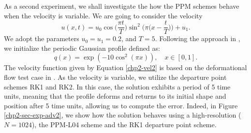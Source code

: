 As a second experiment, we shall investigate the how the PPM schemes behave when the velocity
is variable. 
We are going to consider the velocity
\begin{equation}
	\label{chp2-vel2}
	u(x,t) = u_0\cos{\bigg(\frac{\pi t}{T}\bigg)}\sin^2\bigg(\pi \bigg(x-\frac{t}{T}\bigg)\bigg) + u_1.
\end{equation}
We adopt the parameters $u_0 = u_1 = 0.2$,  and $T = 5$.
Following the approach in \citet{trefethen:2000}, we initialize the periodic Gaussian profile defined as:
\begin{equation}
	\label{chp2-ic2}
	q(x) = \exp(-10\cos^2 (\pi x)),\quad x \in [0,1].
\end{equation}
The velocity function given by Equation \eqref{chp2-vel2} is based
on the deformational flow test case in \citet{nair:2010}.
As the velocity is variable, we utilize the departure point schemes RK1 and RK2.
In this case, the solution exhibits a period of 5 time units,
meaning that the profile deforms and returns to its initial shape
and position after 5 time units, allowing us to compute the error.
Indeed, in Figure \ref{chp2-sec-exp-adv2}, we show how the solution behaves
using a high-resolution ($N=1024$), the PPM-L04 scheme and the RK1 departure point scheme.

